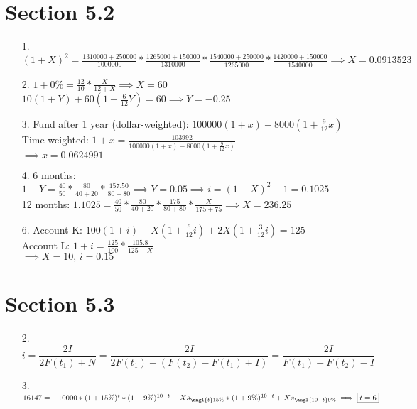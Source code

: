 \documentclass{article}
\begin{document}
\section*{Section 5.2}
\begin{itemize}
	\item [1.] $(1+X)^2=\frac{1310000+250000}{1000000}*\frac{1265000+150000}{1310000}*\frac{1540000+250000}{1265000}*\frac{1420000+150000}{1540000} \implies \boxed{X=0.0913523}$
	\item [2.] $1+0\%=\frac{12}{10}*\frac{X}{12+X}\implies\boxed{X=60}$\\$10(1+Y)+60(1+\frac{6}{12}Y)=60 \implies \boxed{Y=-0.25}$
	\item [3.] Fund after 1 year (dollar-weighted): $100000(1+x)-8000(1+\frac{9}{12}x)$\\Time-weighted: $1+x=\frac{103992}{100000(1+x)-8000(1+\frac{9}{12}x)}$\\$\implies \boxed{x=0.0624991}$
	\item [4.] 6 months: $1+Y=\frac{40}{50}*\frac{80}{40+20}*\frac{157.50}{80+80} \implies Y=0.05 \implies i=(1+X)^2-1=0.1025$\\12 months: $1.1025=\frac{40}{50}*\frac{80}{40+20}*\frac{175}{80+80}*\frac{X}{175+75} \implies \boxed{X=236.25}$
	\item [6.] Account K: $100(1+i)-X(1+\frac{6}{12}i)+2X(1+\frac{3}{12}i)=125$\\Account L: $1+i=\frac{125}{100}*\frac{105.8}{125-X}$\\$\implies X=10\text{, }\boxed{i=0.15}$
\end{itemize}

\section*{Section 5.3}
\begin{itemize}
	\item [2.] $i=\dfrac{2I}{2F(t_1)+N}=\dfrac{2I}{2F(t_1)+(F(t_2)-F(t_1)+I)}=\dfrac{2I}{F(t_1)+F(t_2)-I}$
	\item [3.] $16147=-10000*(1+15\%)^t*(1+9\%)^{10-t}+Xs_{\angl{t}15\%}*(1+9\%)^{10-t}+Xs_{\angl{10-t}9\%} \implies \boxed{t=6}$
\end{itemize}
\end{document}
